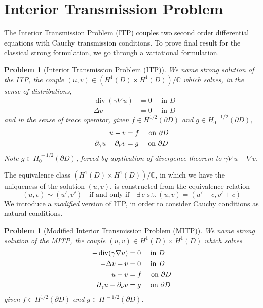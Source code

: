 \documentclass[10pt, a4paper, twoside, openright]{book}
\theoremstyle{definition}
\theoremstyle{plain}
\theoremstyle{plain}
\theoremstyle{plain}
\theoremstyle{plain}
\theoremstyle{plain}
\theoremstyle{plain}
\theoremstyle{plain}
\theoremstyle{plain}
\newtheorem{problem}[subsection]{Problem}
\DeclareMathOperator{\divergence}{div}
\begin{document}
\section{Interior Transmission Problem}
The Interior Transmission Problem (ITP) couples two second order differential equations with Cauchy transmission conditions.
To prove final result for the classical strong formulation, we go through a variational formulation.

\begin{mybox}
\begin{problem}[Interior Transmission Problem (ITP)]
\label{problem:ITP-dist}
We name \emph{strong solution} of the ITP, the couple {$(u,v) \in (H^1(D) \times H^1(D))/\mathbb{C}$} which solves, in the sense of distributions,
\begin{align}
-\divergence(\gamma\nabla u) & = 0\quad\text{ in }D \\
-\Delta v & = 0 \quad\text{ in }D
\end{align}
and in the sense of trace operator, given $f\in H^{1/2}(\partial D)$ and $g\in H^{\,-1/2}_0(\partial D)$,
\begin{align}
  u - v & = f \quad\textup{ on }\partial D\\
  \partial_\gamma u - \partial_\nu v & = g \quad\textup{ on }\partial D
\end{align}
Note $g\in H^{\,-1/2}_0(\partial D)$, forced by application of divergence theorem to $\gamma\nabla u - \nabla v$.
\end{problem}
\end{mybox}
The equivalence class $(H^1(D) \times H^1(D))/\mathbb{C}$, in which we have the uniqueness of the solution $(u,v)$, is constructed from the equivalence relation
\begin{equation}
 (u,v)\sim(u',v') \quad \text{if and only if} \quad \exists \,c \,\,\text{s.t.}\,(u,v) = (u' + c,v' + c) 
\end{equation}
We introduce a \emph{modified} version of ITP, in order to consider Cauchy conditions as natural conditions.
\begin{mybox}
\begin{problem}[Modified Interior Transmission Problem (MITP)]
\label{problem:MITP-dist}
We name \emph{strong solution} of the MITP, the couple {$(u,v) \in H^1(D) \times H^1(D)$} which solves
\begin{align}
-\divergence(\gamma\nabla u) & = 0\quad\text{ in }D \\
-\Delta v + v & = 0 \quad\text{ in }D \\
  u - v & = f \quad\textup{ on }\partial D\\
  \partial_\gamma u - \partial_\nu v & = g \quad\textup{ on }\partial D
\end{align}
given $f\in H^{1/2}(\partial D)$ and $g\in H^{\,-1/2}(\partial D)$.
\end{problem}
\end{mybox}
\end{document}
